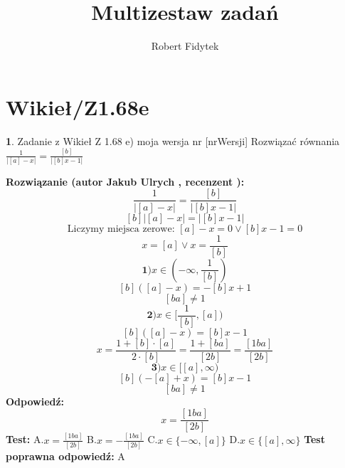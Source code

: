 \documentclass[12pt, a4paper]{article}
\title{Multizestaw zadań}
\author{Robert Fidytek}
\date{}
\theoremstyle{definition} %
\newtheorem{zad}{}
\newcommand{\kategoria}[1]{\section{#1}} %
\newcommand{\zadStart}[1]{\begin{zad}#1\newline} %
\newcommand{\zadStop}{\end{zad}}   %
\newcommand{\rozwStart}[2]{\noindent \textbf{Rozwiązanie (autor #1 , recenzent #2): }\newline} %
\newcommand{\rozwStop}{\newline}                                            %
\newcommand{\odpStart}{\noindent \textbf{Odpowiedź:}\newline}    %
\newcommand{\odpStop}{\newline}                                             %
\newcommand{\testStart}{\noindent \textbf{Test:}\newline} %
\newcommand{\testStop}{\newline} %
\newcommand{\kluczStart}{\noindent \textbf{Test poprawna odpowiedź:}\newline} %
\newcommand{\kluczStop}{\newline} %
\begin{document}
\maketitle


\kategoria{Wikieł/Z1.68e}
\zadStart{Zadanie z Wikieł Z 1.68 e) moja wersja nr [nrWersji]}
Rozwiązać równania $\frac{1}{|[a]-x|}=\frac{[b]}{|[b]x-1|}$
\zadStop
\rozwStart{Jakub Ulrych}{}
$$\frac{1}{|[a]-x|}=\frac{[b]}{|[b]x-1|}$$
$$[b]|[a]-x|=|[b]x-1|$$
$$\text{Liczymy miejsca zerowe: }[a]-x=0\vee[b]x-1=0$$
$$x=[a]\vee x=\frac{1}{[b]}$$
$$\textbf{1)}x\in(-\infty,\frac{1}{[b]})$$
$$[b]([a]-x)=-[b]x+1$$
$$[ba]\neq1$$
$$\textbf{2)}x\in[\frac{1}{[b]},[a])$$
$$[b]([a]-x)=[b]x-1$$
$$x=\frac{1+[b]\cdot[a]}{2\cdot[b]}=\frac{1+[ba]}{[2b]}=\frac{[1ba]}{[2b]}$$
$$\textbf{3)}x\in[[a],\infty)$$
$$[b](-[a]+x)=[b]x-1$$
$$[ba]\neq1$$
\rozwStop
\odpStart
$$x=\frac{[1ba]}{[2b]}$$
\odpStop
\testStart
A.$x=\frac{[1ba]}{[2b]}$
B.$x=-\frac{[1ba]}{[2b]}$
C.$x\in\{-\infty,[a]\}$
D.$x\in\{[a],\infty\}$
\testStop
\kluczStart
A
\kluczStop
\end{document}
